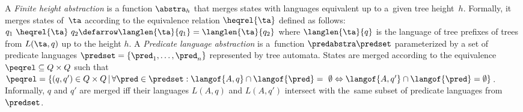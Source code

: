A \emph{Finite height abstraction} 
 is a function $\abstra_h$ that merges states 
 with languages equivalent
up to a~given tree height~$h$.
Formally, it merges states of~$\ta$ according to the equivalence relation $\heqrel{\ta}$ defined as follows:
$q_1~\heqrel{\ta}~q_2 \defarrow \langlen{\ta}{q_1} = \langlen{\ta}{q_2}$ where
$\langlen{\ta}{q}$ is the language of tree prefixes of trees from $L(\ta,q)$  
 up to the height $h$.
%
%
%
A \emph{Predicate language abstraction}
is a~function $\predabstra \predset$ parameterized by a set of predicate languages $\predset=\{\pred_1, \ldots, \pred_n\}$
represented by tree automata.
%
States are merged according to the equivalence ${\peqrel} \subseteq Q \times Q$ such that
${\peqrel} = \{(q,q')\in Q\times Q \,|\, \forall \pred \in \predset: \langof{A,q} \cap \langof{\pred} =~\emptyset \Leftrightarrow \langof{A,q'} \cap \langof{\pred} = \emptyset\}$.
Informally, $q$ and $q'$ are merged iff their languages $L(A,q)$ and $L(A,q')$ intersect with the~same subset of predicate languages from $\predset$.
%



